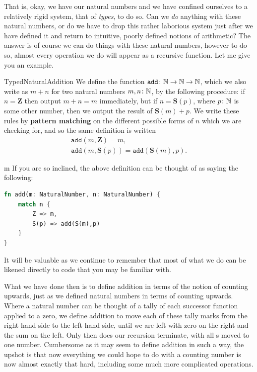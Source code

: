 \documentclass[11pt]{article}
\begin{document}
That is, okay, we have our natural numbers and we have confined ourselves to a relatively rigid system, that of \emph{types}, to do so. Can we \emph{do} anything with these natural numbers, or do we have to drop this rather laborious system just after we have defined it and return to intuitive, poorly defined notions of arithmetic? The answer is of course we can do things with these natural numbers, however to do so, almost every operation we do will appear as a recursive function. Let me give you an example.

\begin{label definition}[Addition]{TypedNaturalAddition}
We define the function $\mathtt{add}\colon \mathbb{N} \to \mathbb{N} \to \mathbb{N}$, which we also write as $m + n$ for two natural numbers $m, n \colon \mathbb{N}$, by the following procedure: if $n = \mathbf{Z}$ then output $m + n = m$ immediately, but if $n = \mathbf{S}(p)$, where $p \colon \mathbb{N}$ is some other number, then we output the result of $\mathbf{S}(m) + p$. We write these rules by \textbf{pattern matching} on the different possible forms of $n$ which we are checking for, and so the same definition is written \begin{gather*}
   \mathtt{add}(m,\mathbf{Z}) = m, \\
   \mathtt{add}(m, \mathbf{S}(p)) = \mathtt{add}(\mathbf{S}(m),p).
\end{gather*}
\end{label definition}

\begin{my proof}{m}
If you are so inclined, the above definition can be thought of as saying the following:
\begin{lstlisting}[language=Rust]
fn add(m: NaturalNumber, n: NaturalNumber) {
	match n {
		Z => m,
		S(p) => add(S(m),p)
	}
}
\end{lstlisting}
It will be valuable as we continue to remember that most of what we do can be likened directly to code that you may be familiar with.
\end{my proof}

What we have done then is to define addition in terms of the notion of counting upwards, just as we defined natural numbers in terms of counting upwards. Where a natural number can be thought of a tally of each successor function applied to a zero, we define addition to move each of these tally marks from the right hand side to the left hand side, until we are left with zero on the right and the sum on the left. Only then does our recursion terminate, with all s moved to one number. Cumbersome as it may seem to define addition in such a way, the upshot is that now everything we could hope to do with a counting number is now almost exactly that hard, including some much more complicated operations.
\end{document}
